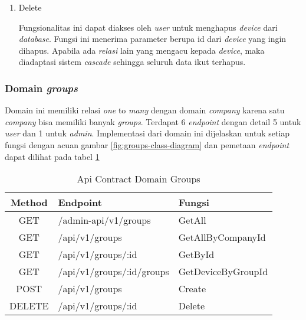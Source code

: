 \begin{enumerate}
    \item Delete

          Fungsionalitas ini dapat diakses oleh \textit{user} untuk menghapus \textit{device} dari \textit{database}. Fungsi ini menerima parameter berupa id dari \textit{device} yang ingin dihapus. Apabila ada \textit{relasi} lain yang mengacu kepada \textit{device}, maka diadaptasi sistem \textit{cascade} sehingga seluruh data ikut terhapus.

\end{enumerate}

\subsubsection{Domain \textit{groups}}

Domain ini memiliki relasi \textit{one} to \textit{many} dengan domain \textit{company} karena satu \textit{company} bisa memiliki banyak \textit{groups}. Terdapat 6 \textit{endpoint} dengan detail 5 untuk \textit{user} dan 1 untuk \textit{admin}. Implementasi dari domain ini dijelaskan untuk setiap fungsi dengan acuan gambar \ref{fig:groups-class-diagram} dan pemetaan \textit{endpoint} dapat dilihat pada tabel \ref{tab:api-contract-domain-groups}

\bgroup
\begin{table}[htbp]
    \caption{Api Contract Domain Groups}
    \label{tab:api-contract-domain-groups}
    \def\arraystretch{1.7}
    \centering
    \begin{tabular}{|c|p{6cm}|p{4cm}|}
        \hline
        Method & Endpoint                  &
        Fungsi                                                  \\
        \hline
        GET    & /admin-api/v1/groups      & GetAll             \\
        \hline
        GET    & /api/v1/groups            & GetAllByCompanyId  \\
        \hline
        GET    & /api/v1/groups/:id        & GetById            \\
        \hline
        GET    & /api/v1/groups/:id/groups & GetDeviceByGroupId \\
        \hline
        POST   & /api/v1/groups            & Create             \\
        \hline
        DELETE & /api/v1/groups/:id        & Delete             \\
        \hline
    \end{tabular}
\end{table}
\egroup


